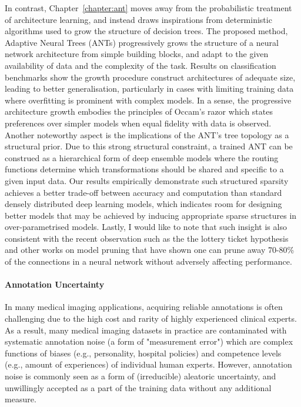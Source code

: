 In contrast, Chapter~\ref{chapter:ant} moves away from the probabilistic treatment of architecture learning, and instead draws inspirations from deterministic algorithms used to grow the structure of decision trees. The proposed method, Adaptive Neural Trees (ANTs) progressively grows the structure of a neural network architecture from simple building blocks, and adapt to the given availability of data and the complexity of the task. Results on classification benchmarks show the growth procedure construct architectures of adequate size, leading to better generalisation, particularly in cases with limiting training data where overfitting is prominent with complex models. In a sense, the progressive architecture growth embodies the principles of Occam's razor \cite{rasmussen2001occam} which states preferences over simpler models when equal fidelity with data is observed. Another noteworthy aspect is the implications of the ANT's tree topology as a structural prior. Due to this strong structural constraint, a trained ANT can be construed as a hierarchical form of deep ensemble models \cite{lakshminarayanan2017simple} where the routing functions determine which transformations should be shared and specific to a given input data. Our results empirically demonstrate such structured sparsity achieves a better trade-off between accuracy and computation than standard densely distributed deep learning models, which indicates room for designing better models that may be achieved by inducing appropriate sparse structures in over-parametrised models.  Lastly, I would like to note that such insight is also consistent with the recent observation such as the the lottery ticket hypothesis \cite{frankle2018lottery} and other works on model pruning \cite{molchanov2016pruning,zhu2017prune} that have shown one can prune away 70-80\% of the connections in a neural network without adversely affecting performance.

\paragraph{Annotation Uncertainty}
In many medical imaging applications, acquiring reliable annotations is often challenging due to the high cost and rarity of highly experienced clinical experts. As a result, many medical imaging datasets in practice are contaminated with systematic annotation noise (a form of "measurement error") which are complex functions of biases (e.g., personality, hospital policies) and competence levels (e.g., amount of experiences) of individual human experts. However, annotation noise is commonly seen as a form of (irreducible) aleatoric uncertainty, and unwillingly accepted as a part of the training data without any additional measure. 

